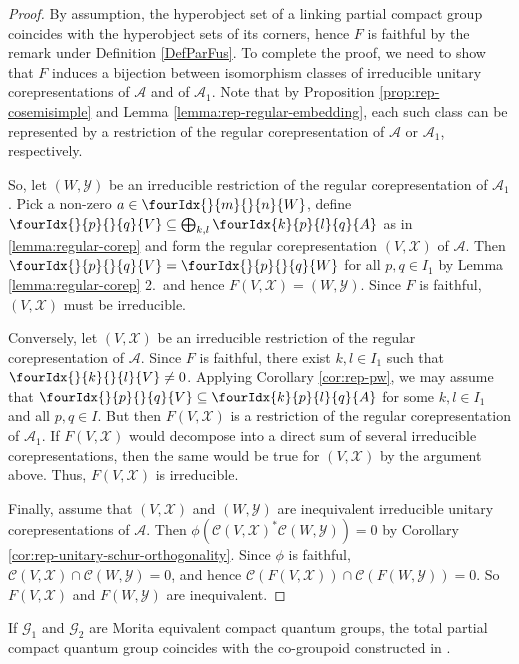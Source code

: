 \documentclass[10pt]{article}
\newcommand{\Gr}[5]{\fourIdx{#2}{#4}{#3}{#5}{#1}}%
\newcommand{\Gru}[3]{\Gr{#1}{}{}{#2}{#3}}
\theoremstyle{definition}
\numberwithin{equation}{section}
\begin{document}
\begin{proof}
By assumption, the hyperobject set of a linking partial compact group coincides with the hyperobject sets of its corners, hence $F$ is faithful by the remark under Definition \ref{DefParFus}.
To complete the proof, we need to show that $F$ induces a
bijection between isomorphism classes of irreducible unitary 
corepresentations of $\mathcal{A}$ and of $\mathcal{A}_{1}$. Note that
by Proposition \ref{prop:rep-cosemisimple} and Lemma
\ref{lemma:rep-regular-embedding}, each such class can be represented
by a restriction of the regular corepresentation of $\mathcal{A}$ or
$\mathcal{A}_{1}$, respectively.

So, let $(W,\mathscr{Y})$ be an irreducible restriction of the regular
corepresentation of $\mathcal{A}_{1}$. Pick a non-zero $a \in
\Gru{W}{m}{n}$, define $\Gru{V}{p}{q} \subseteq \bigoplus_{k,l}
\Gr{A}{k}{l}{p}{q}$ as in \eqref{lemma:regular-corep} and form the
regular corepresentation $(V,\mathscr{X})$ of $\mathscr{A}$. Then
$\Gru{V}{p}{q} = \Gru{W}{p}{q}$ for all $p,q\in I_{1}$ by Lemma
\ref{lemma:regular-corep} 2.\ and hence $F(V,\mathscr{X}) =
(W,\mathscr{Y})$.  Since $F$ is faithful, $(V,\mathscr{X})$ must be
irreducible.

Conversely, let $(V,\mathscr{X})$ be an irreducible restriction of the
regular corepresentation of $\mathcal{A}$. Since $F$ is faithful,
there exist $k,l\in I_{1}$ such that $\Gru{V}{k}{l}\neq 0$. Applying
Corollary \ref{cor:rep-pw}, we may assume that
$\Gru{V}{p}{q} \subseteq \Gr{A}{k}{l}{p}{q}$ for some $k,l\in I_{1}$
and all $p,q\in I$. But then $F(V,\mathscr{X})$ is a restriction of
the regular corepresentation of $\mathcal{A}_{1}$.  If
$F(V,\mathscr{X})$ would decompose into a direct sum of several
irreducible corepresentations, then the same would be true for
$(V,\mathscr{X})$ by the argument above. Thus, $F(V,\mathscr{X})$ is irreducible.

Finally, assume that
$(V,\mathscr{X})$ and $(W,\mathscr{Y})$ are 
inequivalent irreducible unitary corepresentations of $\mathcal{A}$. Then $\phi(\mathcal{C}(V,\mathscr{X})^*\mathcal{C}(W,\mathscr{Y}))=0$ by Corollary \ref{cor:rep-unitary-schur-orthogonality}. Since $\phi$ is faithful, $\mathcal{C}(V,\mathscr{X}) \cap
\mathcal{C}(W,\mathscr{Y})=0$, and hence $\mathcal{C}(F(V,\mathscr{X}))
\cap\mathcal{C}(F(W,\mathscr{Y})) =0$. So $F(V,\mathscr{X})$ and
$F(W,\mathscr{Y})$ are inequivalent.
\end{proof}

If $\mathscr{G}_1$ and $\mathscr{G}_2$ are Morita equivalent compact quantum groups, the total partial compact quantum group coincides with the co-groupoid constructed in \cite{Bic1}. 
\end{document}
